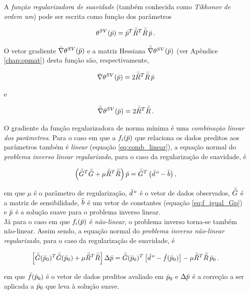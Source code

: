 \indent A {\it função regularizadora de suavidade} (também conhecida como
{\it Tikhonov de ordem um}) pode ser escrita como função dos
parâmetros

\begin{equation}
\theta^{SV}(\bar{p}) = \bar{p}^T \bar{\bar{R}}^T \bar{\bar{R}}\thinspace\bar{p} \thinspace .
\label{eq:suavidade}
\end{equation}

\noindent O vetor gradiente $\bar{\nabla}\theta^{SV}(\bar{p})$ e a matriz Hessiana
$\bar{\bar{\nabla}}\theta^{SV}(\bar{p})$ (ver Apêndice \ref{chap:opmat}) desta função
são, respectivamente,

\begin{equation}
\bar{\nabla}\theta^{SV}(\bar{p}) = 2\bar{\bar{R}}^T \bar{\bar{R}}\thinspace\bar{p}
\end{equation}

\noindent e

\begin{equation}
\bar{\bar{\nabla}}\theta^{SV}(\bar{p}) = 2\bar{\bar{R}}^T \bar{\bar{R}} \thinspace .
\end{equation}

\indent O gradiente da função regularizadora de norma mínima é uma
{\it combinação linear dos parâmetros}.
Para o caso em que a $f_i(\bar{p})$ que relaciona
os dados preditos aos parâmetros também é {\it linear} (equação \ref{eq:comb_linear}),
a equação normal do {\it problema inverso linear regularizado},
para o caso da regularização de suavidade, é

\begin{equation}
\left(\bar{\bar{G}}^T\bar{\bar{G}} + \mu\bar{\bar{R}}^T\bar{\bar{R}}\right)\tilde{p} =
    \bar{\bar{G}}^T\left(\bar{d}^{\thinspace o} - \bar{b} \right) ,
\end{equation}

\noindent em que $\mu$ é o parâmetro de regularização, $\bar{d}^{\thinspace o}$
é o vetor de dados observados, $\bar{\bar{G}}$ é a matriz de sensibilidade, $\bar{b}$
é um vetor de constantes (equação \ref{eq:f_igual_Gp}) e $\tilde{p}$ é a solução
suave para o problema inverso linear.
\\
\indent Já para o caso em que $f_i(\bar{p})$ é {\it não-linear}, o problema
inverso torna-se também não-linear. Assim sendo, a equação normal do
{\it problema inverso não-linear regularizado}, para o caso da regularização de
suavidade, é

\begin{equation}
\left[\bar{\bar{G}}(\bar{p}_0)^T\bar{\bar{G}}(\bar{p}_0) +
      \mu\bar{\bar{R}}^T\bar{\bar{R}}\right]\Delta\bar{p} =
\bar{\bar{G}}(\bar{p}_0)^T \left[\bar{d}^{\thinspace o} - \bar{f}(\bar{p}_0)\right] -
\mu\bar{\bar{R}}^T\bar{\bar{R}}\thinspace\bar{p}_0
    \thinspace .
\end{equation}

\noindent em que $\bar{f}(\bar{p}_0)$ é o vetor de dados preditos avaliado em
$\bar{p}_0$ e $\Delta\bar{p}$ é a correção a ser aplicada a $\bar{p}_0$
que leva à solução suave.
